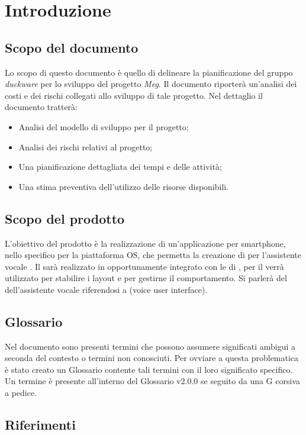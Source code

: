 \clearpage
\section{Introduzione}
\label{sec:intro}
\subsection{Scopo del documento}
Lo scopo di questo documento è quello di delineare la pianificazione del gruppo \emph{duckware} per lo sviluppo del progetto \emph{Meg}. Il documento riporterà un'analisi dei costi e dei rischi collegati allo sviluppo di tale progetto. Nel dettaglio il documento tratterà:
\begin{itemize}
	\item Analisi del modello di sviluppo per il progetto;
	\item Analisi dei rischi relativi al progetto;
	\item Una pianificazione dettagliata dei tempi e delle attività;
	\item Una stima preventiva dell'utilizzo delle risorse disponibili.
\end{itemize}
\subsection{Scopo del prodotto}
L'obiettivo del prodotto è la realizzazione di un'applicazione per smartphone, nello specifico per la piattaforma  OS, che permetta la creazione di  per l'assistente vocale  . Il  sarà realizzato in  opportunamente integrato con le  di , per il  verrà utilizzato  per stabilire i layout e  per gestirne il comportamento. Si parlerà del  dell'assistente vocale riferendosi a (voice user interface).
\subsection{Glossario}
Nel documento sono presenti termini che possono assumere significati ambigui a seconda del contesto o termini non conosciuti. Per ovviare a questa problematica è stato creato un Glossario contente tali termini con il loro significato specifico. Un termine è presente all'interno del Glossario v2.0.0 se seguito da una G corsiva a pedice.
\subsection{Riferimenti}
